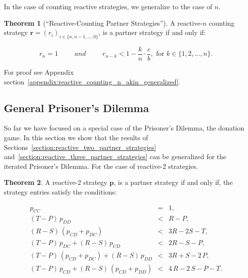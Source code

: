 \documentclass[11pt]{article}
\theoremstyle{definition}
\newtheorem{theorem}{Theorem}[section]
\begin{document}
In the case of counting reactive strategies, we generalize to the case of $n$.

\begin{theorem}[``Reactive-Counting Partner Strategies'']\label{theorem:reactive_counting_partner_strategies}
A reactive-$n$ counting strategy $\mathbf{r}=(r_i)_{i \in \{n, n-1, \dots, 0\}}$,
is a partner strategy if and only if:

\begin{equation}
  r_n = 1 \qquad ~~and~~ \qquad r_{n - k} < 1 - \frac{k}{n} \cdot \frac{c}{b}, \text{ for } k \in \{1, 2, \dots, n\}.
\end{equation}

For proof see Appendix section~\ref{appendix:reactive_counting_n_akin_generalized}.

\end{theorem}


\subsection{General Prisoner's Dilemma}\label{section:general_prisoners_dilemma}

So far we have focused on a special case of the Prisoner's Dilemma, the donation
game. In this section we show that the results of Sections~\ref{section:reactive_two_partner_strategies}
and~\ref{section:reactive_three_partner_strategies} can be generalized
for the iterated Prisoner's Dilemma. For the case of reactive-2 strategies.


\begin{theorem}\label{theorem:reactive_two_partner_strategies_PD}
A reactive-2 strategy $\mathbf{p}$, is a partner strategy if and only if,
the strategy entries satisfy the conditions:

\begin{equation*}
  \begin{array}{ccc}
    p_{CC} & = & 1, \\ [0.2cm]
    (T - P)\, p_{DD} & < & R - P, \\ [0.2cm]
    (R - S)\, (p_{CD} + p_{DC}) & < & 3 R - 2 S - T, \\ [0.2cm]
    (T - P)\, p_{DC}  + (R - S)\, p_{CD} & < & 2 R - S - P, \\ [0.2cm]
    (T - P)\, (p_{CD} + p_{DC}) + (R - S)\, p_{DD}  & < & 3 R + S - 2\,P, \\ [0.2cm]
    (T - P)\, p_{CD}  + (R - S)\, (p_{CD} + p_{DD}) & < & 4\,R - 2\,S - P - T.
\end{array}
\end{equation*}
\end{theorem}
\end{document}
